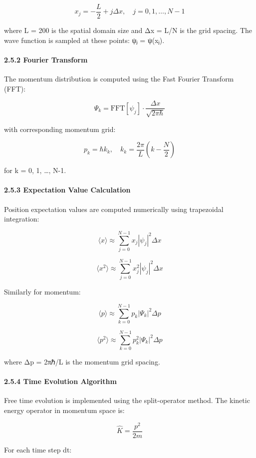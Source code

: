 \documentclass[
]{article}
\begin{document}
\[x_j = -\frac{L}{2} + j\Delta x, \quad j = 0,1,\ldots,N-1\]

where L = 200 is the spatial domain size and Δx = L/N is the grid
spacing. The wave function is sampled at these points: ψⱼ = ψ(xⱼ).

\paragraph{2.5.2 Fourier Transform}\label{fourier-transform}

The momentum distribution is computed using the Fast Fourier Transform
(FFT):

\[\Psi_k = \text{FFT}[\psi_j] \cdot \frac{\Delta x}{\sqrt{2\pi\hbar}}\]

with corresponding momentum grid:

\[p_k = \hbar k_k, \quad k_k = \frac{2\pi}{L}\left(k - \frac{N}{2}\right)\]

for k = 0, 1, \ldots, N-1.

\paragraph{2.5.3 Expectation Value
Calculation}\label{expectation-value-calculation}

Position expectation values are computed numerically using trapezoidal
integration:

\[\langle x \rangle \approx \sum_{j=0}^{N-1} x_j |\psi_j|^2 \Delta x\]

\[\langle x^2 \rangle \approx \sum_{j=0}^{N-1} x_j^2 |\psi_j|^2 \Delta x\]

Similarly for momentum:

\[\langle p \rangle \approx \sum_{k=0}^{N-1} p_k |\Psi_k|^2 \Delta p\]

\[\langle p^2 \rangle \approx \sum_{k=0}^{N-1} p_k^2 |\Psi_k|^2 \Delta p\]

where Δp = 2πℏ/L is the momentum grid spacing.

\paragraph{2.5.4 Time Evolution
Algorithm}\label{time-evolution-algorithm}

Free time evolution is implemented using the split-operator method. The
kinetic energy operator in momentum space is:

\[\hat{K} = \frac{p^2}{2m}\]

For each time step dt:
\end{document}
